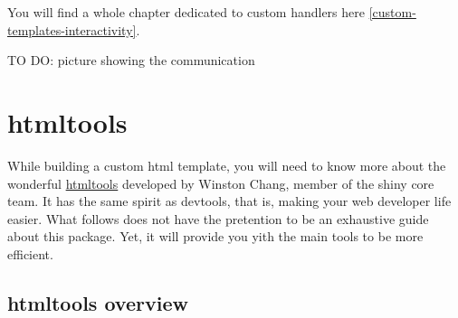 \documentclass[]{book}
\newenvironment{Shaded}{\begin{snugshade}}{\end{snugshade}}
\newcommand{\ControlFlowTok}[1]{\textcolor[rgb]{0.13,0.29,0.53}{\textbf{#1}}}
\newcommand{\DataTypeTok}[1]{\textcolor[rgb]{0.13,0.29,0.53}{#1}}
\newcommand{\DecValTok}[1]{\textcolor[rgb]{0.00,0.00,0.81}{#1}}
\newcommand{\KeywordTok}[1]{\textcolor[rgb]{0.13,0.29,0.53}{\textbf{#1}}}
\newcommand{\NormalTok}[1]{#1}
\newcommand{\OperatorTok}[1]{\textcolor[rgb]{0.81,0.36,0.00}{\textbf{#1}}}
\newcommand{\OtherTok}[1]{\textcolor[rgb]{0.56,0.35,0.01}{#1}}
\newcommand{\StringTok}[1]{\textcolor[rgb]{0.31,0.60,0.02}{#1}}
\begin{document}
\begin{Shaded}
\end{Shaded}

You will find a whole chapter dedicated to custom handlers here \ref{custom-templates-interactivity}.

TO DO: picture showing the communication

\hypertarget{part-htmltools}{%
\part*{htmltools}\label{part-htmltools}}

While building a custom html template, you will need to know more about the wonderful \href{https://github.com/rstudio/htmltools}{htmltools} developed by Winston Chang, member of the shiny core team. It has the same spirit as devtools, that is, making your web developer life easier. What follows does not have the pretention to be an exhaustive guide about this package. Yet, it will provide you yith the main tools to be more efficient.

\hypertarget{htmltools-overview}{%
\chapter{htmltools overview}\label{htmltools-overview}}
\end{document}
